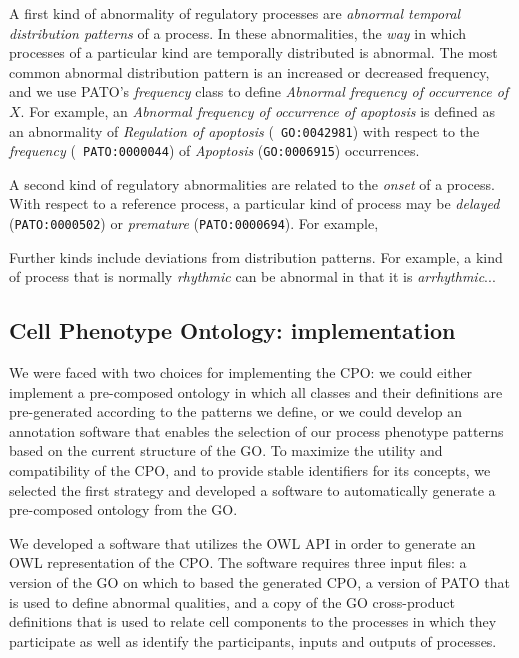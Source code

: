 \documentclass{bioinfo}
\renewcommand{\cite}{\citep}
\begin{document}
A first kind of abnormality of regulatory processes are {\em abnormal
  temporal distribution patterns} of a process. In these
abnormalities, the {\em way} in which processes of a particular kind
are temporally distributed is abnormal.  The most common abnormal
distribution pattern is an increased or decreased frequency, and we
use PATO's {\em frequency} class to define {\em Abnormal frequency of
  occurrence of $X$}.
For example, an {\em Abnormal frequency of occurrence of apoptosis} is
defined as an abnormality of {\em Regulation of apoptosis} ({\tt
  GO:0042981}) with respect to the {\em frequency} ({\tt
  PATO:0000044}) of {\em Apoptosis} ({\tt GO:0006915}) occurrences.

A second kind of regulatory abnormalities are related to the {\em
  onset} of a process. With respect to a reference process, a
particular kind of process may be {\em delayed} ({\tt PATO:0000502})
or {\em premature} ({\tt PATO:0000694}). For example, 


Further kinds include deviations from distribution patterns. For
example, a kind of process that is normally {\em rhythmic} can be
abnormal in that it is {\em arrhythmic}...

\subsection{Cell Phenotype Ontology: implementation}
We were faced with two choices for implementing the CPO: we could
either implement a pre-composed ontology in which all classes and
their definitions are pre-generated according to the patterns we
define, or we could develop an annotation software that enables the
selection of our process phenotype patterns based on the current
structure of the GO.  To maximize the utility and compatibility of the
CPO, and to provide stable identifiers for its concepts, we selected
the first strategy and developed a software to automatically generate
a pre-composed ontology from the GO.

We developed a software that utilizes the OWL API \cite{Horridge2007}
in order to generate an OWL representation of the CPO. The software
requires three input files: a version of the GO on which to based the
generated CPO, a version of PATO that is used to define abnormal
qualities, and a copy of the GO cross-product definitions
\cite{Mungall2010go} that is used to relate cell components to the
processes in which they participate as well as identify the
participants, inputs and outputs of processes.
\end{document}
